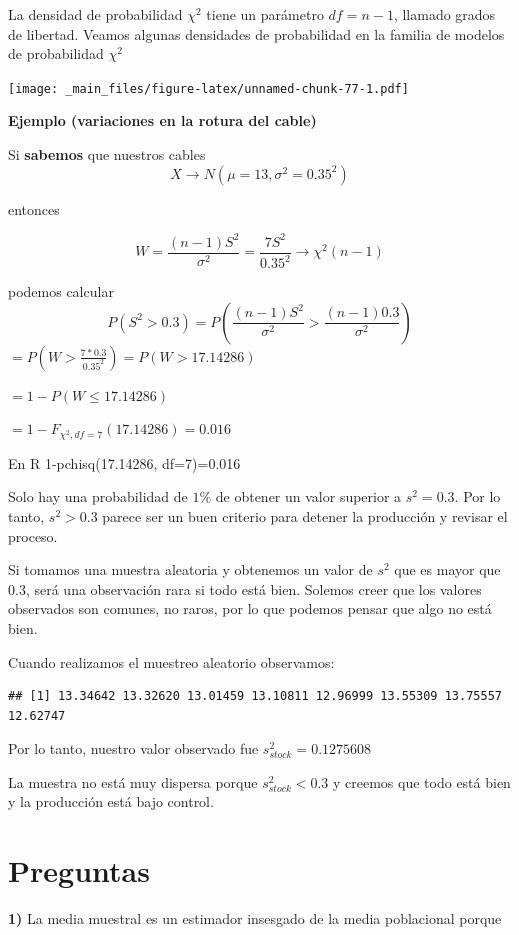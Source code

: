 \documentclass[
]{book}
\begin{document}
La densidad de probabilidad \(\chi^2\) tiene un parámetro \(df=n-1\), llamado grados de libertad. Veamos algunas densidades de probabilidad en la familia de modelos de probabilidad \(\chi^2\)

\texttt{[image: \_main\_files/figure-latex/unnamed-chunk-77-1.pdf]}

\textbf{Ejemplo (variaciones en la rotura del cable)}

Si \textbf{sabemos} que nuestros cables
\[X \rightarrow N(\mu=13, \sigma^2=0.35^2)\]

entonces

\[W=\frac{(n-1)S^2}{\sigma^2}= \frac{7S^2}{0.35^2} \rightarrow \chi^2(n-1)\]

podemos calcular \[P(S^2 > 0.3)=P(\frac{(n-1)S^2}{\sigma^2} > \frac{(n-1)0.3}{\sigma^2 })\]
\(=P(W > \frac{7*0.3}{0.35^2})=P(W > 17.14286)\)

\(=1-P(W \leq 17.14286)\)

\(= 1- F_{\chi^2,df=7}(17.14286)=0.016\)

En R
1-pchisq(17.14286, df=7)=0.016

Solo hay una probabilidad de \(1\%\) de obtener un valor superior a \(s^2=0.3\). Por lo tanto, \(s^2>0.3\) parece ser un buen criterio para detener la producción y revisar el proceso.

Si tomamos una muestra aleatoria y obtenemos un valor de \(s ^2\) que es mayor que \(0.3\), será una observación rara si todo está bien. Solemos creer que los valores observados son comunes, no raros, por lo que podemos pensar que algo no está bien.

Cuando realizamos el muestreo aleatorio observamos:

\begin{verbatim}
## [1] 13.34642 13.32620 13.01459 13.10811 12.96999 13.55309 13.75557 12.62747
\end{verbatim}

Por lo tanto, nuestro valor observado fue \(s^2_{stock}=0.1275608\)

La muestra no está muy dispersa porque \(s^2_{stock} < 0.3\) y creemos que todo está bien y la producción está bajo control.

\hypertarget{preguntas-7}{%
\section{Preguntas}\label{preguntas-7}}

\textbf{1)} La media muestral es un estimador insesgado de la media poblacional porque
\end{document}
